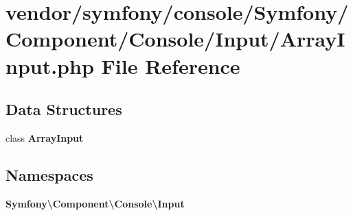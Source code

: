 \section{vendor/symfony/console/\+Symfony/\+Component/\+Console/\+Input/\+Array\+Input.php File Reference}
\label{_array_input_8php}
\subsection*{Data Structures}
\begin{DoxyCompactItemize}
\item 
class {\bf Array\+Input}
\end{DoxyCompactItemize}
\subsection*{Namespaces}
\begin{DoxyCompactItemize}
\item 
 {\bf Symfony\textbackslash{}\+Component\textbackslash{}\+Console\textbackslash{}\+Input}
\end{DoxyCompactItemize}
